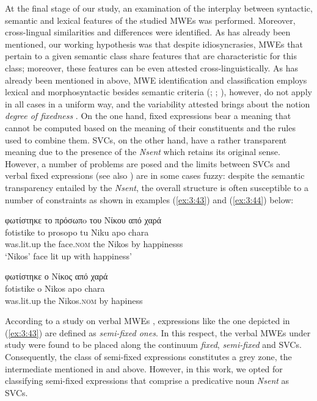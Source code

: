 \documentclass[output=paper]{langsci/langscibook}
\begin{document}
At the final stage of our study, an examination of the interplay between
syntactic, semantic and lexical features of the studied MWEs was
performed. Moreover,  cross-lingual similarities and differences were
identified. As has already been mentioned, our working hypothesis was
that despite idiosyncrasies, MWEs that pertain to a given semantic
class share features that are characteristic for this class; moreover,
these features can be even attested cross-linguistically. As has
already been mentioned in  above, MWE identification and
classification employs lexical and morphosyntactic besides semantic
criteria (\citealt{gross1982}; \citealt{Gross1998}; \citealt{lamiroy2003}), however, do not apply in all cases in a
uniform way, and the variability attested brings about the notion 
\textit{degree of fixedness} \citep{gross1996}.  On the one hand,
fixed expressions bear a meaning that cannot be computed based on the
meaning of their constituents and the rules used to combine them. SVCs,
on the other hand, have a rather transparent meaning due to the
presence of the \textit{Nsent }which retains its original sense.
However, a number of problems are posed and the limits between SVCs and
verbal fixed expressions (see also  ) are in some cases
fuzzy: despite the semantic transparency entailed by the
\textit{Νsent}, the overall structure is often susceptible to a number
of constraints as shown in examples (\ref{ex:3:43}) and (\ref{ex:3:44}) below:


\begin{exe}
\ex \label{ex:3:43}
\glll φωτίστηκε το πρόσωπo του Νίκου από χαρά\\
fotistike to prosopo tu Niku apo chara\\
was.lit.up the face.\textsc{nom} the Nikos by happinesss\\
\glt %
‘Nikos’ face lit up with happiness’
\end{exe}

\begin{exe}
\ex \label{ex:3:44} 
\glll *φωτίστηκε ο Νίκος από χαρά\\
fotistike o Nikos apo chara\\
was.lit.up the Nikos.\textsc{nom} by hapiness\\
\end{exe}



According to a study on verbal MWEs \citep{balibar1995}, expressions
like the one depicted in (\ref{ex:3:43}) are defined as
\textit{semi-fixed \textup{ones}}. In this respect, the
verbal MWEs under study were found to be placed along the continuum
\textit{fixed}, \textit{semi-fixed} and SVCs. Consequently,
the class of semi-fixed expressions constitutes a grey zone, the
intermediate mentioned in  and  above. However, in this work, we opted for classifying semi-fixed expressions that
comprise a predicative noun \textit{Nsent} as SVCs.
\end{document}

